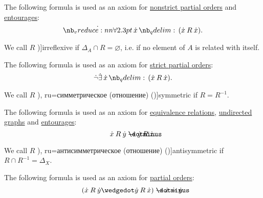 \begin{definition}
\begin{thmenum}[resume=def:binary_relation]
    The following formula is used as an axiom for \hyperref[def:strict_partial_order]{nonstrict partial orders} and \hyperref[def:entourage]{entourages}:
    \begin{equation}\label{eq:def:binary_relation/reflexive}
      \qforall \synx (\synx \mathbin{R} \synx).
    \end{equation}

     We call \( R \) \term[ru=антирефлексивное (отношение) (\cite[def. 2.7]{Гуров2013Решётки})]{irreflexive} if \( \Delta_A \cap R = \varnothing \), i.e. if no element of \( A \) is related with itself.

    The following formula is used as an axiom for \hyperref[def:strict_partial_order]{strict partial orders}:
    \begin{equation}\label{eq:def:binary_relation/irreflexive}
      \synneg \qexists \synx (\synx \mathbin{R} \synx).
    \end{equation}

     We call \( R \) \term[bg=симетрична (релация) (\cite[369]{ГеновМиховскиМоллов1991Алгебра}), ru=симметрическое (отношение) (\cite[def. 2.7]{Гуров2013Решётки})]{symmetric} if \( R = R^{-1} \).

    The following formula is used as an axiom for \hyperref[def:equivalence_relation]{equivalence relations}, \hyperref[def:hypergraph/multigraph]{undirected graphs} and \hyperref[def:entourage]{entourages}:
    \begin{equation}\label{eq:def:binary_relation/symmetric}
      \synx \mathbin{R} \syny \synimplies \syny \mathbin{R} \synx.
    \end{equation}

     We call \( R \) \term[bg=антисиметрична (релация) (\cite[369]{ГеновМиховскиМоллов1991Алгебра}), ru=антисимметрическое (отношение) (\cite[def. 2.7]{Гуров2013Решётки})]{antisymmetric} if \( R \cap R^{-1} = \Delta_X \).

    The following formula is used as an axiom for \hyperref[def:partially_ordered_set]{partial orders}:
    \begin{equation}\label{eq:def:binary_relation/antisymmetric}
      (\synx \mathbin{R} \syny \synwedge \syny \mathbin{R} \synx) \synimplies \synx \syneq \syny.
    \end{equation}


\end{thmenum}
\end{definition}
